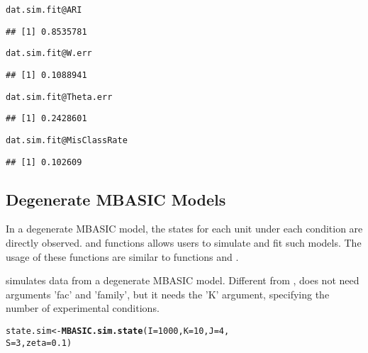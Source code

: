 \documentclass[a4paper,10pt]{article}\usepackage[]{graphicx}\usepackage[]{color}
\makeatletter
\newcommand{\hlnum}[1]{\textcolor[rgb]{0.686,0.059,0.569}{#1}}%
\newcommand{\hlopt}[1]{\textcolor[rgb]{0,0,0}{#1}}%
\newcommand{\hlstd}[1]{\textcolor[rgb]{0.345,0.345,0.345}{#1}}%
\newcommand{\hlkwb}[1]{\textcolor[rgb]{0.69,0.353,0.396}{#1}}%
\newcommand{\hlkwc}[1]{\textcolor[rgb]{0.333,0.667,0.333}{#1}}%
\newcommand{\hlkwd}[1]{\textcolor[rgb]{0.737,0.353,0.396}{\textbf{#1}}}%
\newenvironment{kframe}{%
 \def\at@end@of@kframe{}%
 \ifinner\ifhmode%
  \def\at@end@of@kframe{\end{minipage}}%
  \begin{minipage}{\columnwidth}%
 \fi\fi%
 \def\FrameCommand##1{\hskip\@totalleftmargin \hskip-\fboxsep
 \colorbox{shadecolor}{##1}\hskip-\fboxsep
     \hskip-\linewidth \hskip-\@totalleftmargin \hskip\columnwidth}%
 \MakeFramed {\advance\hsize-\width
   \@totalleftmargin\z@ \linewidth\hsize
   \@setminipage}}%
 {\par\unskip\endMakeFramed%
 \at@end@of@kframe}
\newenvironment{knitrout}{}{} %
\makeatother
\begin{document}
\begin{knitrout}
\color{fgcolor}\begin{kframe}
\begin{alltt}
\hlstd{dat.sim.fit}\hlopt{@}\hlkwc{ARI}
\end{alltt}
\begin{verbatim}
## [1] 0.8535781
\end{verbatim}
\begin{alltt}
\hlstd{dat.sim.fit}\hlopt{@}\hlkwc{W.err}
\end{alltt}
\begin{verbatim}
## [1] 0.1088941
\end{verbatim}
\begin{alltt}
\hlstd{dat.sim.fit}\hlopt{@}\hlkwc{Theta.err}
\end{alltt}
\begin{verbatim}
## [1] 0.2428601
\end{verbatim}
\begin{alltt}
\hlstd{dat.sim.fit}\hlopt{@}\hlkwc{MisClassRate}
\end{alltt}
\begin{verbatim}
## [1] 0.102609
\end{verbatim}
\end{kframe}
\end{knitrout}

\subsection{Degenerate MBASIC Models}

In a degenerate MBASIC model, the states for each unit under each condition are directly observed.  and  functions allows users to simulate and fit such models. The usage of these functions are similar to functions  and .

 simulates data from a degenerate MBASIC model. Different from ,  does not need arguments 'fac' and 'family', but it needs the 'K' argument, specifying the number of experimental conditions.

\begin{knitrout}
\color{fgcolor}\begin{kframe}
\begin{alltt}
\hlstd{state.sim} \hlkwb{<-} \hlkwd{MBASIC.sim.state}\hlstd{(}\hlkwc{I} \hlstd{=} \hlnum{1000}\hlstd{,} \hlkwc{K} \hlstd{=} \hlnum{10}\hlstd{,} \hlkwc{J} \hlstd{=} \hlnum{4}\hlstd{,}
    \hlkwc{S} \hlstd{=} \hlnum{3}\hlstd{,} \hlkwc{zeta} \hlstd{=} \hlnum{0.1}\hlstd{)}
\end{alltt}
\end{kframe}
\end{knitrout}
\end{document}
